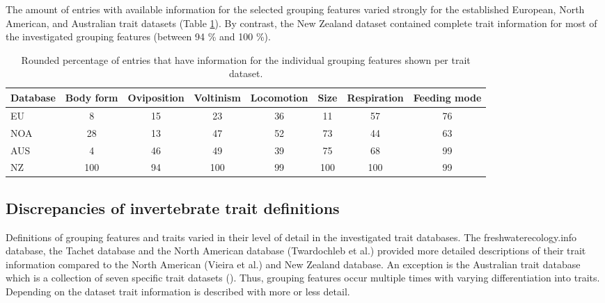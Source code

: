 \documentclass{article}
\begin{document}
The amount of entries with available information for the selected grouping features varied strongly for the established European, North American, and Australian trait datasets (Table \ref{tab:trait_coverage}). By contrast, the New Zealand dataset contained complete trait information for most of the investigated grouping features (between 94 \% and 100 \%).

\begin{table}[ht]
    \centering
    \caption{Rounded percentage of entries that have 
    information for the individual grouping features
    shown per trait dataset.} 
    \label{tab:trait_coverage}
    \begin{tabular}{lccccccc}
    \toprule[.1em]
    Database & Body form & Oviposition & Voltinism & Locomotion & Size & Respiration & Feeding mode \\ 
    \toprule[.1em]
    EU & 8 & 15 & 23 & 36 & 11 & 57 & 76 \\ 
    NOA & 28 & 13 & 47 & 52 & 73 & 44 & 63 \\ 
    AUS & 4 & 46 & 49 & 39 & 75 & 68 & 99 \\ 
    NZ & 100 & 94 & 100 & 99 & 100 & 100 & 99 \\ 
    \bottomrule
    \end{tabular}
\end{table}

\newpage


\subsection*{Discrepancies of invertebrate trait definitions}

Definitions of grouping features and traits varied in their level of detail in the investigated trait databases. The freshwaterecology.info database, the Tachet database and the North American database (Twardochleb et al.) provided more detailed descriptions of their trait information compared to the North American (Vieira et al.) and New Zealand database. An exception is the Australian trait database which is a collection of seven specific trait datasets (\cite{kefford_integrated_2020}). Thus, grouping features occur multiple times with varying differentiation into traits. Depending on the dataset trait information is described with more or less detail.
\end{document}
